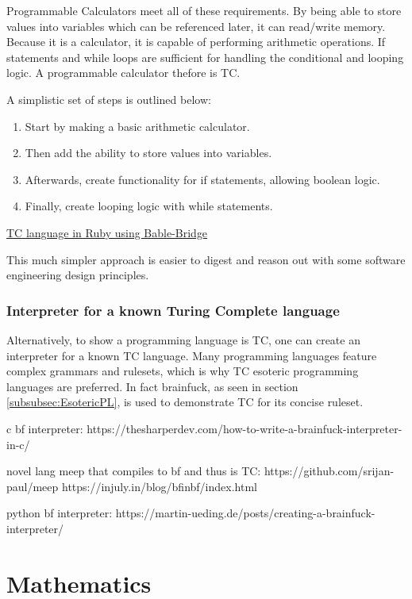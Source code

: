 Programmable Calculators meet all of these requirements.
By being able to store values into variables which can be referenced later, it can read/write memory.
Because it is a calculator, it is capable of performing arithmetic operations.
If statements and while loops are sufficient for handling the conditional and looping logic.
A programmable calculator thefore is TC.

A simplistic set of steps is outlined below:

\begin{enumerate}
    \item Start by making a basic arithmetic calculator.
    \item Then add the ability to store values into variables.
    \item Afterwards, create functionality for if statements, allowing boolean logic.
    \item Finally, create looping logic with while statements.
\end{enumerate}

\href{https://www.youtube.com/watch?v=_Uoyufkb5lk}{TC language in Ruby using Bable-Bridge}

This much simpler approach is easier to digest and reason out with some software engineering design principles.

\subsubsection{Interpreter for a known Turing Complete language}\label{subsec:InterpreterTC}

Alternatively, to show a programming language is TC, one can create an interpreter for a known TC language.
Many programming languages feature complex grammars and rulesets, which is why TC esoteric programming languages are preferred.
In fact brainfuck, as seen in section \ref{subsubsec:EsotericPL}, is used to demonstrate TC for its concise ruleset.

c bf interpreter: https://thesharperdev.com/how-to-write-a-brainfuck-interpreter-in-c/

novel lang meep that compiles to bf and thus is TC: https://github.com/srijan-paul/meep
https://injuly.in/blog/bfinbf/index.html

python bf interpreter: https://martin-ueding.de/posts/creating-a-brainfuck-interpreter/


\section{Mathematics}\label{sec:Maths}

